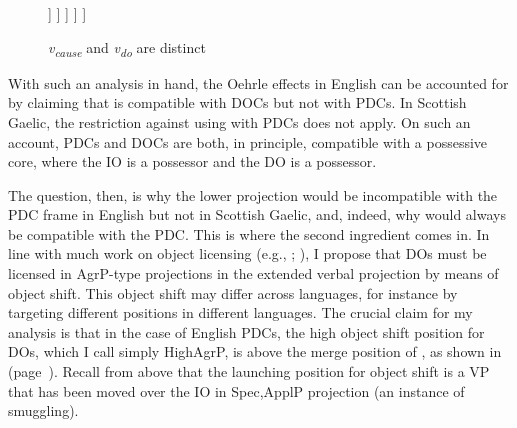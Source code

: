 \documentclass[output=paper,colorlinks,citecolor=brown]{langscibook}
\begin{document}
\begin{figure}[hp]
\begin{forest}
	[\textit{v}P
		[DP\textsubscript{agent}]
		[, nice empty nodes
			[\textit{v}\textsubscript{do}]
			[... 				
				[\textit{v}P
					[DP\textsubscript{causer}]
					[, nice empty nodes
						[\textit{v}\textsubscript{cause}]
						[...]
					]
				]
			]
		]
	]
\end{forest}
{\caption{\textit{v\textsubscript{cause}} and \textit{v\textsubscript{do}} are distinct }\label{subj}}
\end{figure}

\noindent With such an analysis in hand, the Oehrle effects in English can be accounted for by claiming that  is compatible with DOCs but not with PDCs. In Scottish Gaelic, the restriction against using  with PDCs does not apply. On such an account, PDCs and DOCs are both, in principle, compatible with a possessive core, where the IO is a possessor and the DO is a possessor. 

The question, then, is why the lower  projection would be incompatible with the PDC frame in English but not in Scottish Gaelic, and, indeed, why   would always be compatible with the PDC. This is where the second ingredient comes in. In line with much work on object licensing (e.g., \citealt{gt:Johnson:1991}; \citealt{gt:Collins:1993}), I propose that DOs must be licensed in AgrP-type projections in the extended verbal projection by means of object shift. This object shift may differ across languages, for instance by targeting different positions in different languages. The crucial claim for my analysis is that in the case of English PDCs, the high object shift position for DOs, which I call simply HighAgrP, is above the merge position of , as shown in  (page~\pageref{gt:obj1}). Recall from  above that the launching position for object shift is a VP that has been moved over the IO in Spec,ApplP projection (an instance of smuggling).
\end{document}
